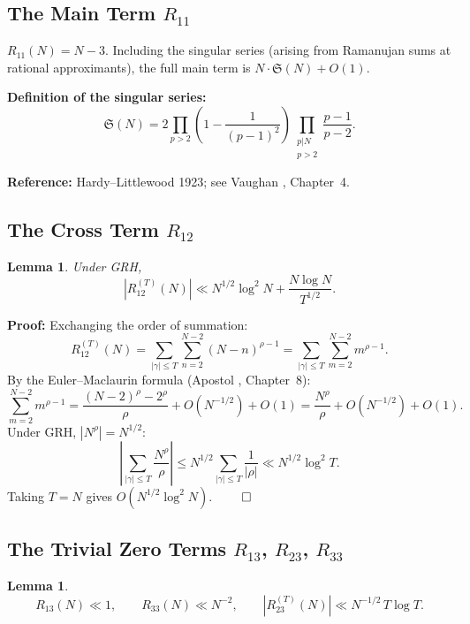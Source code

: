 \documentclass[11pt,a4paper]{article}
\newtheorem{lemma}[theorem]{Lemma}
\theoremstyle{remark}
\begin{document}
\subsection{The Main Term $R_{11}$}\label{sec:R11main}

$R_{11}(N) = N - 3$. Including the singular series (arising from Ramanujan sums at rational approximants), the full main term is $N \cdot \mathfrak{S}(N) + O(1)$.

\noindent\textbf{Definition of the singular series:}
\begin{equation}\label{eq:singS}
\mathfrak{S}(N) = 2\prod_{p>2}\left(1 - \frac{1}{(p-1)^2}\right) \prod_{\substack{p|N \\ p>2}} \frac{p-1}{p-2}.
\end{equation}

\noindent\textbf{Reference:} Hardy--Littlewood 1923; see Vaughan \cite{vaughan}, Chapter~4.

\subsection{The Cross Term $R_{12}$}

\begin{lemma}\label{lem:R12}
Under GRH,
\begin{equation}\label{eq:R12bound}
|R_{12}^{(T)}(N)| \ll N^{1/2}\log^2 N + \frac{N\log N}{T^{1/2}}.
\end{equation}
\end{lemma}

\noindent\textbf{Proof:} Exchanging the order of summation:
\[
R_{12}^{(T)}(N) = \sum_{|\gamma| \leq T} \sum_{n=2}^{N-2} (N-n)^{\rho-1} = \sum_{|\gamma| \leq T} \sum_{m=2}^{N-2} m^{\rho-1}.
\]
By the Euler--Maclaurin formula (Apostol \cite{apostol}, Chapter~8):
\[
\sum_{m=2}^{N-2} m^{\rho-1} = \frac{(N-2)^\rho - 2^\rho}{\rho} + O(N^{-1/2}) + O(1) = \frac{N^\rho}{\rho} + O(N^{-1/2}) + O(1).
\]
Under GRH, $|N^\rho| = N^{1/2}$:
\[
\left|\sum_{|\gamma| \leq T} \frac{N^\rho}{\rho}\right| \leq N^{1/2} \sum_{|\gamma| \leq T} \frac{1}{|\rho|} \ll N^{1/2}\log^2 T.
\]
Taking $T = N$ gives $O(N^{1/2}\log^2 N)$. $\qed$

\subsection{The Trivial Zero Terms $R_{13}$, $R_{23}$, $R_{33}$}\label{sec:trivial}

\begin{lemma}\label{lem:trivial}
\begin{equation}\label{eq:trivialbound}
R_{13}(N) \ll 1, \qquad R_{33}(N) \ll N^{-2}, \qquad |R_{23}^{(T)}(N)| \ll N^{-1/2}\, T\log T.
\end{equation}
\end{lemma}
\end{document}
